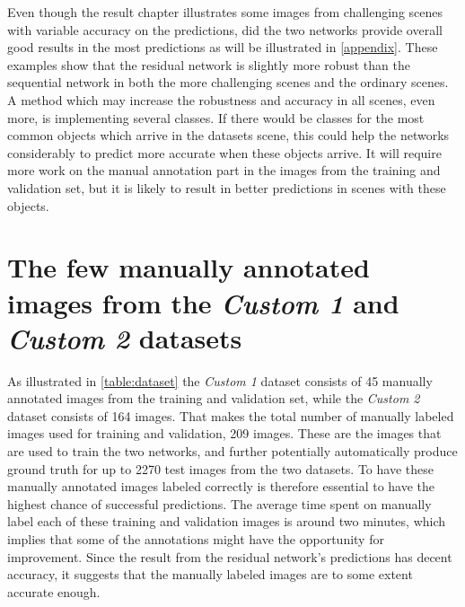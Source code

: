 \documentclass[USenglish]{ifimaster}  %
\begin{document}
Even though the result chapter illustrates some images from challenging scenes with variable accuracy on the predictions, did the two networks provide overall good results in the most predictions as will be illustrated in \cref{appendix}. These examples show that the residual network is slightly more robust than the sequential network in both the more challenging scenes and the ordinary scenes. A method which may increase the robustness and accuracy in all scenes, even more, is implementing several classes. If there would be classes for the most common objects which arrive in the datasets scene, this could help the networks considerably to predict more accurate when these objects arrive. It will require more work on the manual annotation part in the images from the training and validation set, but it is likely to result in better predictions in scenes with these objects. 

\section{The few manually annotated images from the \textit{Custom 1} and \textit{Custom 2} datasets}
As illustrated in \cref{table:dataset} the \textit{Custom 1} dataset consists of 45 manually annotated images from the training and validation set, while the \textit{Custom 2} dataset consists of 164 images. That makes the total number of manually labeled images used for training and validation, 209 images. These are the images that are used to train the two networks, and further potentially automatically produce ground truth for up to 2270 test images from the two datasets. To have these manually annotated images labeled correctly is therefore essential to have the highest chance of successful predictions. The average time spent on manually label each of these training and validation images is around two minutes, which implies that some of the annotations might have the opportunity for improvement. Since the result from the residual network's predictions has decent accuracy, it suggests that the manually labeled images are to some extent accurate enough.          
\end{document}
